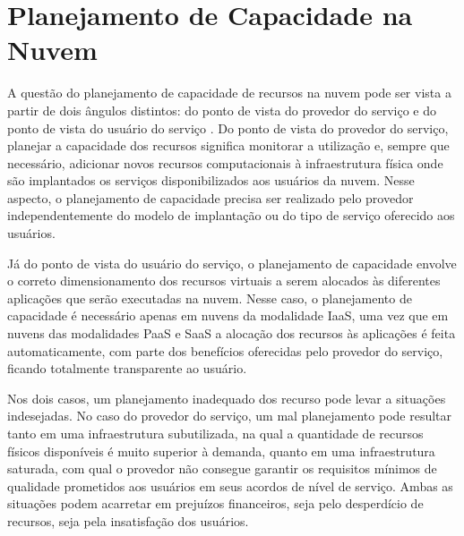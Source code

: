 

\section{Planejamento de Capacidade na Nuvem}

A questão do planejamento de capacidade de recursos na nuvem pode ser vista a partir de dois ângulos distintos: do ponto de vista do provedor do serviço e do ponto de vista do usuário do serviço \cite{Menasce2009}. Do ponto de vista do provedor do serviço, planejar a capacidade dos recursos significa monitorar a utilização e, sempre que necessário, adicionar novos  recursos computacionais à infraestrutura física onde são implantados os serviços disponibilizados aos usuários da nuvem. Nesse aspecto, o planejamento de capacidade precisa ser realizado pelo provedor independentemente do modelo de implantação ou do tipo de serviço oferecido aos usuários.

Já do ponto de vista do usuário do serviço, o planejamento de capacidade envolve o correto dimensionamento dos recursos virtuais a serem alocados às diferentes aplicações que serão executadas na nuvem. Nesse caso, o planejamento de capacidade é necessário apenas em nuvens da modalidade IaaS, uma vez que em nuvens das modalidades PaaS e SaaS a alocação dos recursos às aplicações é feita automaticamente, com parte dos benefícios oferecidas pelo provedor do serviço, ficando totalmente transparente ao usuário. 

Nos dois casos, um planejamento inadequado dos recurso pode levar a situações indesejadas. No caso do provedor do serviço, um mal planejamento pode resultar tanto em uma infraestrutura subutilizada, na qual a quantidade de recursos físicos disponíveis é muito superior à demanda, quanto em uma infraestrutura saturada, com qual o provedor não consegue garantir os requisitos mínimos de qualidade prometidos aos usuários em seus acordos de nível de serviço. Ambas as situações podem acarretar em prejuízos financeiros, seja pelo desperdício de recursos, seja pela insatisfação dos usuários.

